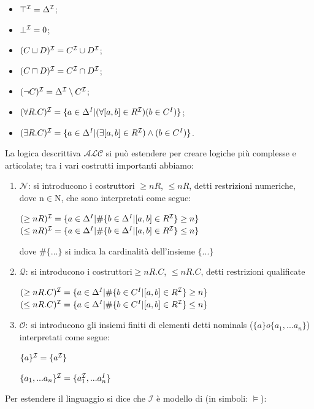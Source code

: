 \documentclass[a4paper,11pt]{article}
\newcommand{\alc}{%
   \ensuremath{\mathcal{ALC}}\xspace}
\newcommand{\I}{%
        \ensuremath{\mathcal{I}}\xspace}
\newcommand{\Q}{%
  \ensuremath{\mathcal{Q}}\xspace}
\newcommand{\N}{%
  \ensuremath{\mathcal{N}}\xspace}
\newcommand{\Onom}{%
  \ensuremath{\mathcal{O}}\xspace}
\begin{document}
\begin{itemize}
\item $\top^{\I}=\Delta^\I$;
\item $\bot^{\I}=0$;
\item $(C \sqcup  D)^{\I}=C^{\I} \cup D^{\I}$;
\item $(C \sqcap  D)^{\I}=C^{\I} \cap D^{\I}$;
\item $(\neg C)^{\I}=\Delta^{\I} \setminus C^{\I}$;
\item $(\forall R.C)^{\I}=\{a \in \Delta^{I} | (\forall[a,b] \in R^{\I}) (b \in C^{I})\}$;
\item $(\exists R.C)^{\I}=\{a \in \Delta^{I} | (\exists[a,b] \in R^{\I})\wedge (b \in C^{I})\}$.
\end{itemize} La logica descrittiva $\alc$ si può estendere per creare logiche più complesse e articolate; tra i vari costrutti importanti abbiamo:
\begin{enumerate}
\item $\N$: si introducono i costruttori $\geq nR$, $\leq nR$, detti restrizioni numeriche, dove n$\in$N, che sono interpretati come segue:
\begin{center}
		$(\geq nR)^{\I}=\{a \in \Delta^{I}|\#\{b \in \Delta^{I} |[a,b] \in R^{\I}\}\geq n\}$\newline$(\leq nR)^{\I}=\{a \in \Delta^{I}|\#\{b \in \Delta^{I} |[a,b] \in R^{\I}\}\leq n\}$\newline
\end{center} dove $\#\{...\}$ si indica la cardinalità dell'insieme $\{...\}$
\item $\Q$: si introducono i costruttori$\geq nR.C$, $\leq nR.C$, detti restrizioni qualificate
\begin{center}
$(\geq nR.C)^{\I}=\{a \in \Delta^{I}|\#\{b \in C^{I} |[a,b] \in R^{\I}\}\geq n\}$ $(\leq nR.C)^{\I}=\{a \in \Delta^{I}|\#\{b \in C^{I} |[a,b] \in R^{\I}\}\leq n\}$
\end{center}
\item $\Onom$: si introducono gli insiemi finiti di elementi 
detti nominals ($\{a\} o \{a_1,...a_n\} $) interpretati come segue:
\begin{center}
$\{a\}^{\I}=\{a^{\I}\}$
\end{center}
\begin{center}
$\{a_1,...a_n\}^{\I}=\{a_1^{\I},...a_n^{I}\}$
\end{center}
\end{enumerate}
Per estendere il linguaggio si dice che $\I$ è modello di (in simboli: $\models$):\newline
\end{document}
